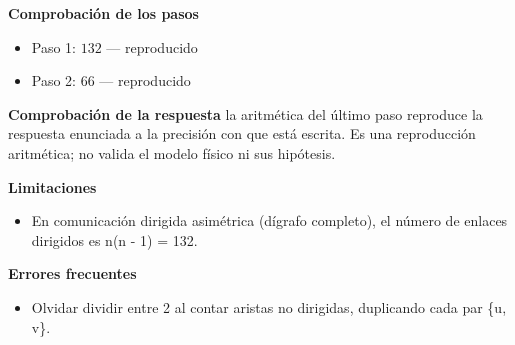 \documentclass{book}
\begin{document}
\begin{tcolorbox}[title={Problema resuelto}, studiumworked, breakable]
\noindent\textbf{Comprobación de los pasos}
\begin{itemize}
\item Paso 1: $132$ — reproducido
\item Paso 2: $66$ — reproducido
\end{itemize}

\noindent\textbf{Comprobación de la respuesta} la aritmética del último paso reproduce la respuesta enunciada a la precisión con que está escrita. Es una reproducción aritmética; no valida el modelo físico ni sus hipótesis.

\noindent\textbf{Limitaciones}
\begin{itemize}
\item En comunicación dirigida asimétrica (dígrafo completo), el número de enlaces dirigidos es n(n - 1) = 132.
\end{itemize}

\noindent\textbf{Errores frecuentes}
\begin{itemize}
\item Olvidar dividir entre 2 al contar aristas no dirigidas, duplicando cada par \{u, v\}.
\end{itemize}
\end{tcolorbox}
\end{document}
